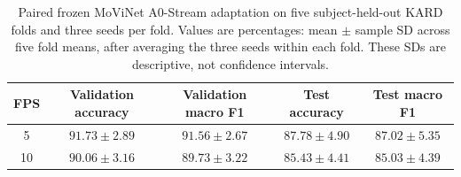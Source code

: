 \begin{table}[t]
\centering
\caption{Paired frozen MoViNet A0-Stream adaptation on five subject-held-out KARD folds and three seeds per fold. Values are percentages: mean $\pm$ sample SD across five fold means, after averaging the three seeds within each fold. These SDs are descriptive, not confidence intervals.}
\label{tab:kard-sampling-cv}
\begin{tabular}{ccccc}
\toprule
FPS & Validation accuracy & Validation macro F1 & Test accuracy & Test macro F1 \\
\midrule
5 & $91.73 \pm 2.89$ & $91.56 \pm 2.67$ & $87.78 \pm 4.90$ & $87.02 \pm 5.35$ \\
10 & $90.06 \pm 3.16$ & $89.73 \pm 3.22$ & $85.43 \pm 4.41$ & $85.03 \pm 4.39$ \\
\bottomrule
\end{tabular}
\end{table}
